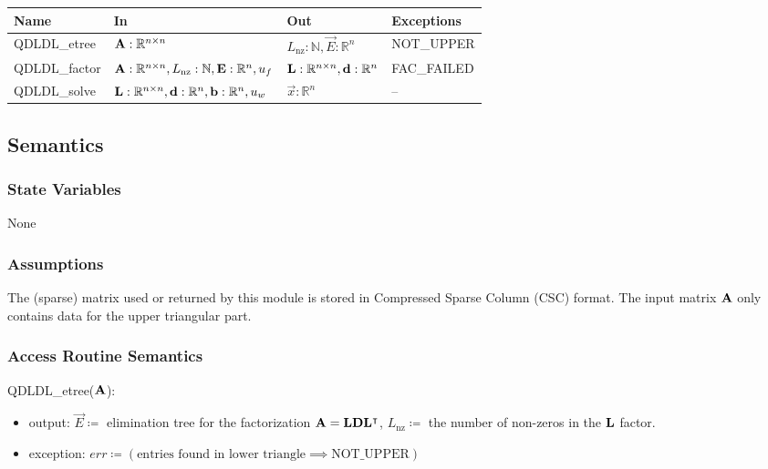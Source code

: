 \documentclass[12pt, titlepage]{article}
\begin{document}
\begin{center}
  \begin{tabular}{p{3cm} p{5cm} p{5cm} p{2cm}}
    \hline
    \textbf{Name}       & \textbf{In}                                           & \textbf{Out}                          & \textbf{Exceptions} \\
    \hline
    QDLDL\_etree  & \(\mathbf{A}: \mathbb{R}^{n \times n}\)                         & \(L_\mathrm{nz}: \mathbb{N}, \vec{E}: \mathbb{R}^n\)          & NOT\_UPPER    \\
    QDLDL\_factor & \(\mathbf{A}: \mathbb{R}^{n \times n}, L_\mathrm{nz}: \mathbb{N}, \mathbf{E}: \mathbb{R}^n, u_f\) & \(\mathbf{L}: \mathbb{R}^{n \times n}, \mathbf{d}: \mathbb{R}^n\) & FAC\_FAILED   \\
    QDLDL\_solve  & \(\mathbf{L}: \mathbb{R}^{n \times n}, \mathbf{d}: \mathbb{R}^n, \mathbf{b}: \mathbb{R}^n, u_w\)     & \(\vec{x}: \mathbb{R}^n\)                      & --            \\
    \hline
  \end{tabular}
\end{center}

\subsection{Semantics}

\subsubsection{State Variables}

None

\subsubsection{Assumptions}

The (sparse) matrix used or returned by this module is stored in Compressed
Sparse Column (CSC) format. The input matrix \(\mathbf{A}\) only contains data for
the upper triangular part.

\subsubsection{Access Routine Semantics}

\noindent QDLDL\_etree(\(\mathbf{A}\)):
\begin{itemize}
\item output: \(\vec{E} \coloneq\) elimination tree for the factorization \(\mathbf{A} =
  \mathbf{L}\mathbf{D}\mathbf{L}^\intercal{}\), \(L_\mathrm{nz} \coloneq\) the number of
  non-zeros in the \(\mathbf{L}\) factor.
\item exception: \(err \coloneq (\text{entries found in lower triangle} \implies
  \text{NOT\_UPPER})\)
\end{itemize}
\end{document}
